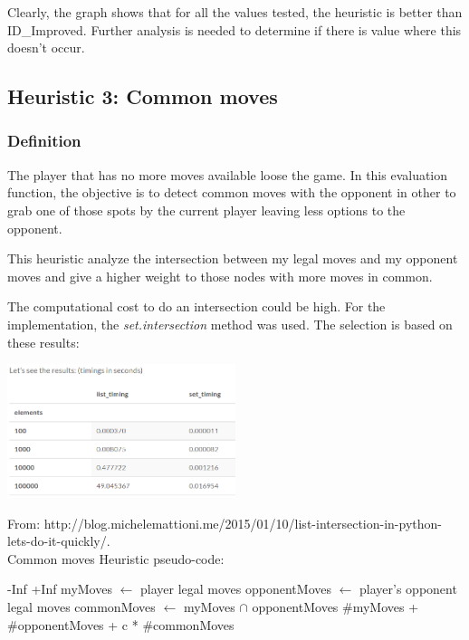 \documentclass[10pt, a4paper,english]{article}
\begin{document}
Clearly, the graph shows that for all the values tested, the heuristic is better than ID\_Improved. Further analysis is needed to determine if there is value where this doesn't occur.

\subsection{Heuristic 3: Common moves}

\subsubsection{Definition}

The player that has no more moves available loose the game. In this evaluation function, the objective is to detect common moves with the opponent in other to grab one of those spots by the current player leaving less options to the opponent.

This heuristic analyze the intersection between my legal moves and my opponent moves and give a higher weight to those nodes with more moves in common.

The computational cost to do an intersection could be high. For the implementation, the \textit{set.intersection} method was used. The selection is based on these results:

\begin{center}
\includegraphics[width=0.5\textwidth]{time_intersec.png}\\
\end{center}

\scriptsize{From: http://blog.michelemattioni.me/2015/01/10/list-intersection-in-python-lets-do-it-quickly/}. \\

Common moves Heuristic pseudo-code: \\

\begin{algorithmic}
    \State\Return -Inf
\EndIf    
{}
   \State \Return +Inf
\Else
		\State myMoves $\leftarrow$ player legal moves
    	\State opponentMoves $\leftarrow$ player's opponent legal moves
        \State commonMoves $\leftarrow$ myMoves $\cap$ opponentMoves
    	\State\Return \#myMoves + \#opponentMoves + c * \#commonMoves
	
\EndIf
\EndFunction
\end{algorithmic}
\end{document}
